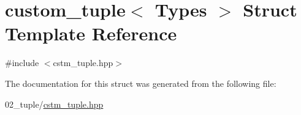 \hypertarget{structcustom__tuple}{}\section{custom\+\_\+tuple$<$ Types $>$ Struct Template Reference}
\label{structcustom__tuple}


{\ttfamily \#include $<$cstm\+\_\+tuple.\+hpp$>$}



The documentation for this struct was generated from the following file\+:\begin{DoxyCompactItemize}
\item 
02\+\_\+tuple/\hyperlink{cstm__tuple_8hpp}{cstm\+\_\+tuple.\+hpp}\end{DoxyCompactItemize}
